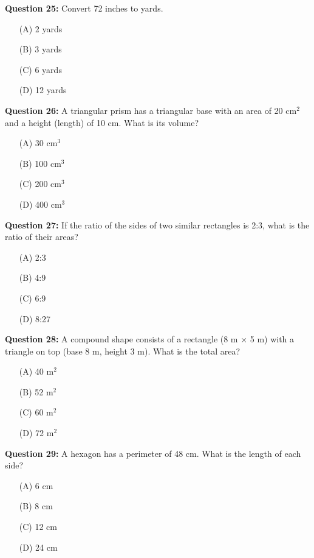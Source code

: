 \documentclass[12pt, letterpaper]{article}
\begin{document}
\noindent
\textbf{Question 25:} Convert 72 inches to yards.
\begin{itemize}
    \item[(A)] 2 yards
    \item[(B)] 3 yards
    \item[(C)] 6 yards
    \item[(D)] 12 yards
\end{itemize}

\noindent
\textbf{Question 26:} A triangular prism has a triangular base with an area of 20 cm$^2$ and a height (length) of 10 cm. What is its volume?
\begin{itemize}
    \item[(A)] 30 cm$^3$
    \item[(B)] 100 cm$^3$
    \item[(C)] 200 cm$^3$
    \item[(D)] 400 cm$^3$
\end{itemize}

\noindent
\textbf{Question 27:} If the ratio of the sides of two similar rectangles is 2:3, what is the ratio of their areas?
\begin{itemize}
    \item[(A)] 2:3
    \item[(B)] 4:9
    \item[(C)] 6:9
    \item[(D)] 8:27
\end{itemize}

\noindent
\textbf{Question 28:} A compound shape consists of a rectangle (8 m × 5 m) with a triangle on top (base 8 m, height 3 m). What is the total area?
\begin{itemize}
    \item[(A)] 40 m$^2$
    \item[(B)] 52 m$^2$
    \item[(C)] 60 m$^2$
    \item[(D)] 72 m$^2$
\end{itemize}

\noindent
\textbf{Question 29:} A hexagon has a perimeter of 48 cm. What is the length of each side?
\begin{itemize}
    \item[(A)] 6 cm
    \item[(B)] 8 cm
    \item[(C)] 12 cm
    \item[(D)] 24 cm
\end{itemize}
\end{document}
